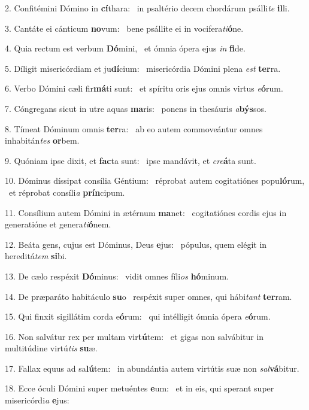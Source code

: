 2. Confitémini Dómino in \textbf{cí}thara: \ast\  in psaltério decem chordárum psálli\textit{te} \textbf{il}li.\

3. Cantáte ei cánticum \textbf{no}vum: \ast\  bene psállite ei in vocifera\textit{ti}\textbf{ó}ne.\

4. Quia rectum est verbum \textbf{Dó}mini, \ast\  et ómnia ópera ejus \textit{in} \textbf{fi}de.\

5. Díligit misericórdiam et ju\textbf{dí}cium: \ast\  misericórdia Dómini plena \textit{est} \textbf{ter}ra.\

6. Verbo Dómini cæli fir\textbf{má}ti sunt: \ast\  et spíritu oris ejus omnis virtus \textit{e}\textbf{ó}rum.\

7. Cóngregans sicut in utre aquas \textbf{ma}ris: \ast\  ponens in thesáuris \textit{a}\textbf{býs}sos.\

8. Tímeat Dóminum omnis \textbf{ter}ra: \ast\  ab eo autem commoveántur omnes inhabitán\textit{tes} \textbf{or}bem.\

9. Quóniam ipse dixit, et \textbf{fac}ta sunt: \ast\  ipse mandávit, et \textit{cre}\textbf{á}ta sunt.\

10. Dóminus díssipat consília Géntium: \dag\  réprobat autem cogitatiónes popu\textbf{ló}rum, \ast\  et réprobat consíli\textit{a} \textbf{prín}cipum.\

11. Consílium autem Dómini in ætérnum \textbf{ma}net: \ast\  cogitatiónes cordis ejus in generatióne et genera\textit{ti}\textbf{ó}nem.\

12. Beáta gens, cujus est Dóminus, Deus \textbf{e}jus: \ast\  pópulus, quem elégit in hereditá\textit{tem} \textbf{si}bi.\

13. De cælo respéxit \textbf{Dó}minus: \ast\  vidit omnes fíli\textit{os} \textbf{hó}minum.\

14. De præparáto habitáculo \textbf{su}o \ast\  respéxit super omnes, qui hábi\textit{tant} \textbf{ter}ram.\

15. Qui finxit sigillátim corda e\textbf{ó}rum: \ast\  qui intélligit ómnia ópera \textit{e}\textbf{ó}rum.\

16. Non salvátur rex per multam vir\textbf{tú}tem: \ast\  et gigas non salvábitur in multitúdine virtú\textit{tis} \textbf{su}æ.\

17. Fallax equus ad sa\textbf{lú}tem: \ast\  in abundántia autem virtútis suæ non \textit{sal}\textbf{vá}bitur.\

18. Ecce óculi Dómini super metuéntes \textbf{e}um: \ast\  et in eis, qui sperant super misericórdi\textit{a} \textbf{e}jus:\

